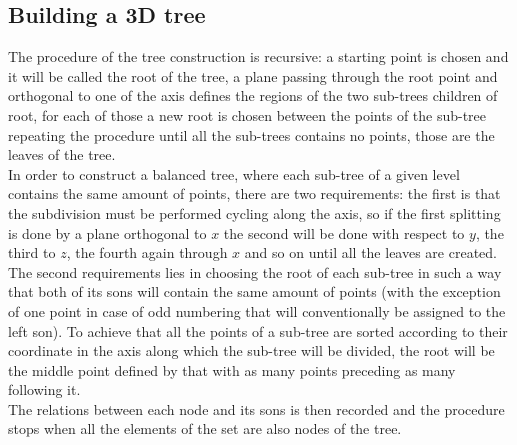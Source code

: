 \subsection{Building a 3D tree}
The procedure of the tree construction is recursive: a starting point is chosen and it will be called the root of the tree, a plane passing through the root point and orthogonal to one of the axis defines the regions of the two sub-trees children of root, for each of those a new root is chosen between the points of the sub-tree repeating the procedure until all the sub-trees contains no points, those are the leaves of the tree.\\
In order to construct a balanced tree, where each sub-tree of a given level contains the same amount of points, there are two requirements: the first is that the subdivision must be performed cycling along the axis, so if the first splitting is done by a plane orthogonal to $x$ the second will be done with respect to $y$, the third to $z$, the fourth again through $x$ and so on until all the leaves are created.\\
The second requirements lies in choosing the root of each sub-tree in such a way that both of its sons will contain the same amount of points (with the exception of one point in case of odd numbering that will conventionally be assigned to the left son). To achieve that all the points of a sub-tree are sorted according to their coordinate in the axis along which the sub-tree will be divided, the root will be the middle point defined by that with as many points preceding as many following it.\\
The relations between each node and its sons is then recorded and the procedure stops when all the elements of the set are also nodes of the tree.

